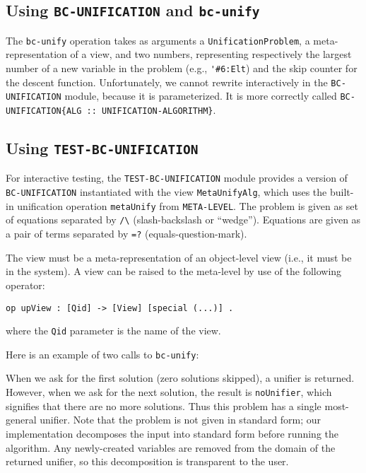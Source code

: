 \documentclass[11pt]{article}
\newcommand{\TitleListing}[1]{\texorpdfstring{\lstinline|#1|}{#1}}
\begin{document}
\subsection{Using \TitleListing{BC-UNIFICATION} and \TitleListing{bc-unify}}
\label{subappendix:using-bc-unif-mod}

The \lstinline|bc-unify| operation takes as arguments a
\lstinline|UnificationProblem|, a meta-representation of a view, and two
numbers, representing respectively the largest number of a new variable in the
problem (e.g., \lstinline|'#6:Elt|) and the skip counter for the descent
function. Unfortunately, we cannot rewrite interactively in the
\lstinline|BC-UNIFICATION| module, because it is parameterized. It is more
correctly called \lstinline|BC-UNIFICATION{ALG :: UNIFICATION-ALGORITHM}|.

\subsection{Using \TitleListing{TEST-BC-UNIFICATION}}
\label{subappendix:using-bc-test-mod}

For interactive testing, the \lstinline|TEST-BC-UNIFICATION| module provides a
version of \lstinline|BC-UNIFICATION| instantiated with the view
\lstinline|MetaUnifyAlg|, which uses the built-in unification operation
\lstinline|metaUnify| from \lstinline|META-LEVEL|. The problem is given as
set of equations separated by \lstinline|/\| (slash-backslash or ``wedge'').
Equations are given as a pair of terms separated by \lstinline|=?|
(equals-question-mark).

The view must be a meta-representation of an object-level view (i.e., it must
be in the system). A view can be raised to the meta-level by use of the
following operator:
\begin{lstlisting}[language=Maude, style=smalllisting]
    op upView : [Qid] -> [View] [special (...)] .
\end{lstlisting}
where the \lstinline|Qid| parameter is the name of the view.

Here is an example of two calls to \lstinline|bc-unify|:
\vspace{1ex}

When we ask for the first solution (zero solutions skipped), a unifier is
returned. However, when we ask for the next solution, the result is
\lstinline|noUnifier|, which signifies that there are no more solutions.  Thus
this problem has a single most-general unifier.  Note that the problem is not
given in standard form; our implementation decomposes the input into standard
form before running the algorithm. Any newly-created variables are removed from
the domain of the returned unifier, so this decomposition is transparent to the
user.
\end{document}
